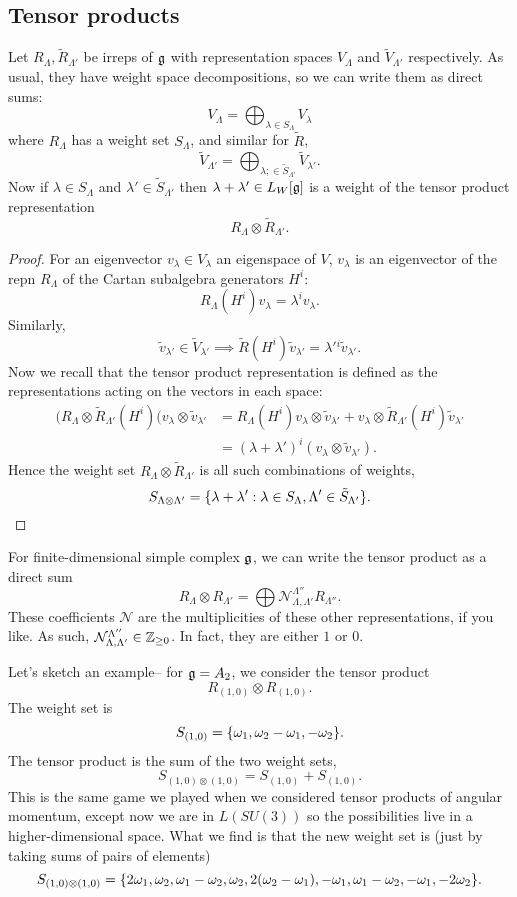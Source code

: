 \subsection*{Tensor products} Let $R_\Lambda,\tilde R_{\Lambda'}$ be irreps of $\mathfrak{g}$ with representation spaces $V_\Lambda$ and $\tilde V_{\Lambda'}$ respectively. As usual, they have weight space decompositions, so we can write them as direct sums:
$$V_\Lambda =\bigoplus_{\lambda\in S_\Lambda}V_\lambda$$
where $R_\Lambda$ has a weight set $S_\Lambda$, and similar for $\tilde R$,
$$\tilde V_{\Lambda'} =\bigoplus_{\lambda;\in \tilde S_{\Lambda'}}\tilde V_{\lambda'}.$$
Now if $\lambda \in S_\Lambda$ and $\lambda'\in \tilde S_{\Lambda'}$ then $\lambda+\lambda'\in L_W[\mathfrak{g}]$ is a weight of the tensor product representation
$$R_\Lambda \otimes \tilde R_{\Lambda'}.$$
\begin{proof}
For an eigenvector $v_\lambda \in V_\lambda$ an eigenspace of $V$, $v_\lambda$ is an eigenvector of the repn $R_\Lambda$ of the Cartan subalgebra generators $H^i$:
$$R_\Lambda(H^i)v_\lambda=\lambda^i v_\lambda.$$
Similarly,
$$\tilde v_{\lambda'}\in \tilde V_{\lambda'}\implies \tilde R(H^i)\tilde v_{\lambda'} = \lambda'{}^i \tilde v_{\lambda'}.$$
Now we recall that the tensor product representation is defined as the representations acting on the vectors in each space:
\begin{align*}
    (R_\Lambda \otimes \tilde R_{\Lambda'}(H^i)(v_\lambda\otimes \tilde v_{\lambda'}&= R_\Lambda (H^i)v_\lambda \otimes \tilde v_{\lambda'}
    +v_\lambda \otimes \tilde R_{\Lambda'}(H^i)\tilde v_{\lambda'}\\
    &=(\lambda+\lambda')^i(v_\lambda\otimes \tilde v_{\lambda'}).
\end{align*}
Hence the weight set $R_\Lambda \otimes \tilde R_{\Lambda'}$ is all such combinations of weights,
$$S_{\Lambda\otimes \Lambda'}=\{\lambda+\lambda':\lambda\in S_\Lambda, \Lambda' \in \tilde S_{\Lambda'}\}.$$
\end{proof}
For finite-dimensional simple complex $\mathfrak{g}$, we can write the tensor product as a direct sum
$$R_\Lambda \otimes R_{\Lambda'} =\bigoplus \mathcal{N}_{\Lambda,\Lambda'}^{\Lambda''}R_{\Lambda''}.$$
These coefficients $\mathcal{N}$ are the multiplicities of these other representations, if you like. As such, $\mathcal{N}_{\Lambda,\Lambda'}^{\Lambda''}\in \mathbb{Z}_{\geq 0}$. In fact, they are either $1$ or $0$.

\begin{exm}
Let's sketch an example-- for $\mathfrak{g}=A_2$, we consider the tensor product
$$R_{(1,0)}\otimes R_{(1,0)}.$$
The weight set is
$$S_{(1,0)}=\{\omega_1,\omega_2-\omega_1,-\omega_2\}.$$
The tensor product is the sum of the two weight sets,
$$S_{(1,0)\otimes (1,0)}=S_{(1,0)}+S_{(1,0)}.$$
This is the same game we played when we considered tensor products of angular momentum, except now we are in $L(SU(3))$ so the possibilities live in a higher-dimensional space. What we find is that the new weight set is (just by taking sums of pairs of elements)
$$S_{(1,0)\otimes (1,0)}=\{2\omega_1,\omega_2,\omega_1-\omega_2,\omega_2,2(\omega_2-\omega_1),-\omega_1,\omega_1-\omega_2,-\omega_1,-2\omega_2\}.$$
\end{exm}

